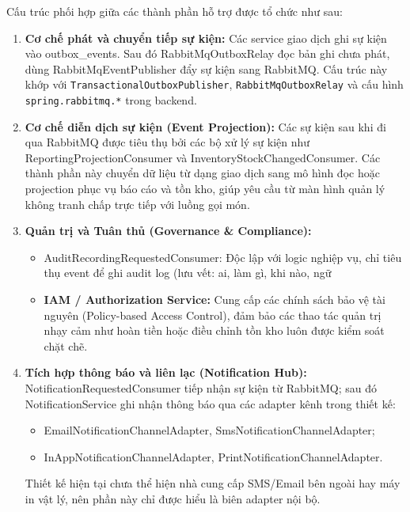 Cấu trúc phối hợp giữa các thành phần hỗ trợ được tổ chức như sau:

\begin{enumerate}
    \item \textbf{Cơ chế phát và chuyển tiếp sự kiện:} Các service giao dịch ghi sự kiện vào \textsf{outbox\_events}. Sau đó \textsf{RabbitMqOutboxRelay} đọc bản ghi chưa phát, dùng \textsf{RabbitMqEventPublisher} đẩy sự kiện sang \textsf{RabbitMQ}. Cấu trúc này khớp với \texttt{TransactionalOutboxPublisher}, \texttt{RabbitMqOutboxRelay} và cấu hình \texttt{spring.rabbitmq.*} trong backend.

    \item \textbf{Cơ chế diễn dịch sự kiện (Event Projection):} Các sự kiện sau khi đi qua \textsf{RabbitMQ} được tiêu thụ bởi các bộ xử lý sự kiện như \textsf{ReportingProjectionConsumer} và \textsf{InventoryStockChangedConsumer}. Các thành phần này chuyển dữ liệu từ dạng giao dịch sang mô hình đọc hoặc projection phục vụ báo cáo và tồn kho, giúp yêu cầu từ màn hình quản lý không tranh chấp trực tiếp với luồng gọi món.
    
    \item \textbf{Quản trị và Tuân thủ (Governance \& Compliance):} 
    \begin{itemize}
        \item \textsf{AuditRecordingRequestedConsumer}: Độc lập với logic nghiệp vụ, chỉ tiêu thụ event để ghi audit log (lưu vết: ai, làm gì, khi nào, ngữ
        \item \textbf{IAM / Authorization Service:} Cung cấp các chính sách bảo vệ tài nguyên (Policy-based Access Control), đảm bảo các thao tác quản trị nhạy cảm như hoàn tiền hoặc điều chỉnh tồn kho luôn được kiểm soát chặt chẽ.
    \end{itemize}

    \item \textbf{Tích hợp thông báo và liên lạc (Notification Hub):} \textsf{NotificationRequestedConsumer} tiếp nhận sự kiện từ \textsf{RabbitMQ}; sau đó \textsf{NotificationService} ghi nhận thông báo qua các adapter kênh trong thiết kế:
    \begin{itemize}
        \item \textsf{EmailNotificationChannelAdapter}, \textsf{SmsNotificationChannelAdapter};
        \item \textsf{InAppNotificationChannelAdapter}, \textsf{PrintNotificationChannelAdapter}.
    \end{itemize}
    Thiết kế hiện tại chưa thể hiện nhà cung cấp SMS/Email bên ngoài hay máy in vật lý, nên phần này chỉ được hiểu là biên adapter nội bộ.
\end{enumerate}

